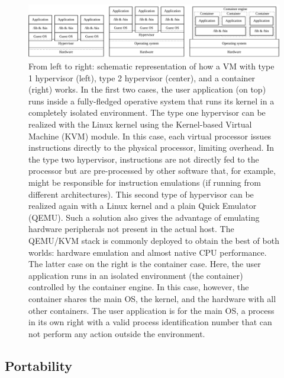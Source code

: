 \begin{figure}[h]
    \centering
    \includegraphics[width=\textwidth]{img/chpt1/VM-vs-Container}
    \caption{From left to right: schematic representation of how a VM with type 1 hypervisor (left), type 2 hypervisor (center), and a container (right) works. In the first two cases, the user application (on top) runs inside a fully-fledged operative system that runs its kernel in a completely isolated environment. The type one hypervisor can be realized with the Linux kernel using the Kernel-based Virtual Machine (KVM)  module. In this case, each virtual processor issues instructions directly to the physical processor, limiting overhead. In the type two hypervisor, instructions are not directly fed to the processor but are pre-processed by other software that, for example, might be responsible for instruction emulations (if running from different architectures). This second type of hypervisor can be realized again with a Linux kernel and a plain Quick Emulator (QEMU). Such a solution also gives the advantage of emulating hardware peripherals not present in the actual host. The QEMU/KVM stack is commonly deployed to obtain the best of both worlds: hardware emulation and almost native CPU performance. The latter case on the right is the container case. Here, the user application runs in an isolated environment (the container) controlled by the container engine. In this case, however, the container shares the main OS, the kernel, and the hardware with all other containers. The user application is for the main OS, a process in its own right with a valid process identification number that can not perform any action outside the environment.}
    \label{fig:VM-vs-Container}
\end{figure}


\subsection{Portability}\label{subsec:chpt1-portability}

